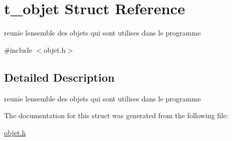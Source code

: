 \hypertarget{structt__objet}{}\section{t\+\_\+objet Struct Reference}
\label{structt__objet}


reunie l\textquotesingle{}ensemble des objets qui sont utilises dans le programme  




{\ttfamily \#include $<$objet.\+h$>$}



\subsection{Detailed Description}
reunie l\textquotesingle{}ensemble des objets qui sont utilises dans le programme 

The documentation for this struct was generated from the following file\+:\begin{DoxyCompactItemize}
\item 
\hyperlink{objet_8h}{objet.\+h}\end{DoxyCompactItemize}
